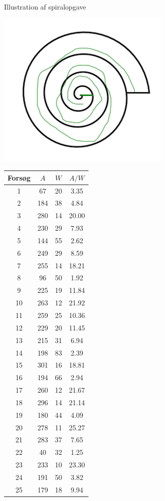 \begin{minipage}[t]{.4\textwidth}
\label{fig:tunnelopgaver}
\caption{Illustration af spiralopgave}
\includegraphics[scale=0.5]{billeder/spiral.png}
\label{fig:spiralopgave}

\end{minipage}\hfill
\begin{minipage}[t]{.4\textwidth}
\centering
\vspace{0pt}
    \begin{tabular}{ c c c c }
        Forsøg & $A$ & $W$ & $A/W$ \\\hline\hline
        1  & 67  & 20 & 3.35  \\
        2  & 184 & 38 & 4.84  \\
        3  & 280 & 14 & 20.00 \\
        4  & 230 & 29 & 7.93  \\
        5  & 144 & 55 & 2.62  \\
        6  & 249 & 29 & 8.59  \\
        7  & 255 & 14 & 18.21 \\
        8  & 96  & 50 & 1.92  \\
        9  & 225 & 19 & 11.84 \\
        10 & 263 & 12 & 21.92 \\
        11 & 259 & 25 & 10.36 \\
        12 & 229 & 20 & 11.45 \\
        13 & 215 & 31 & 6.94  \\
        14 & 198 & 83 & 2.39  \\
        15 & 301 & 16 & 18.81 \\
        16 & 194 & 66 & 2.94  \\
        17 & 260 & 12 & 21.67 \\
        18 & 296 & 14 & 21.14 \\
        19 & 180 & 44 & 4.09  \\
        20 & 278 & 11 & 25.27 \\
        21 & 283 & 37 & 7.65  \\
        22 & 40  & 32 & 1.25  \\
        23 & 233 & 10 & 23.30 \\
        24 & 191 & 50 & 3.82  \\
        25 & 179 & 18 & 9.94  \\\hline
    \end{tabular}
    \label{tab:pegeopgave}
\end{minipage}


